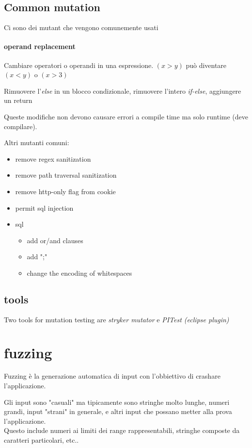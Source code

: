 \documentclass{article}
\begin{document}
\subsection{Common mutation}
Ci sono dei mutant che vengono comunemente usati
\paragraph{operand replacement}
Cambiare operatori o operandi in una espressione. $(x>y)$ può diventare $(x<y)$ o $(x>3)$ 

Rimuovere l'\textit{else} in un blocco condizionale, rimuovere l'intero \textit{if-else}, aggiungere un return

Queste modifiche non devono causare errori a compile time ma solo runtime (deve compilare).

Altri mutanti comuni:
\begin{itemize}
    \item remove regex sanitization
    \item remove path traversal sanitization
    \item remove http-only flag from cookie
    \item permit sql injection
    \item sql 
    \begin{itemize}
        \item add or/and clauses
        \item add ";"
        \item change the encoding of whitespaces
    \end{itemize}
\end{itemize}

\subsection{tools}
Two tools for mutation testing are \textit{stryker mutator} e \textit{PITest (eclipse plugin)}

\section{fuzzing}
Fuzzing è la generazione automatica di input con l'obbiettivo di crashare \\ l'applicazione.

Gli input sono "casuali" ma tipicamente sono stringhe molto lunghe, numeri grandi, input "strani" in generale, e altri input che possano metter alla prova l'applicazione.\\
Questo include numeri ai limiti dei range rappresentabili, stringhe composte da caratteri particolari, etc..
\end{document}
